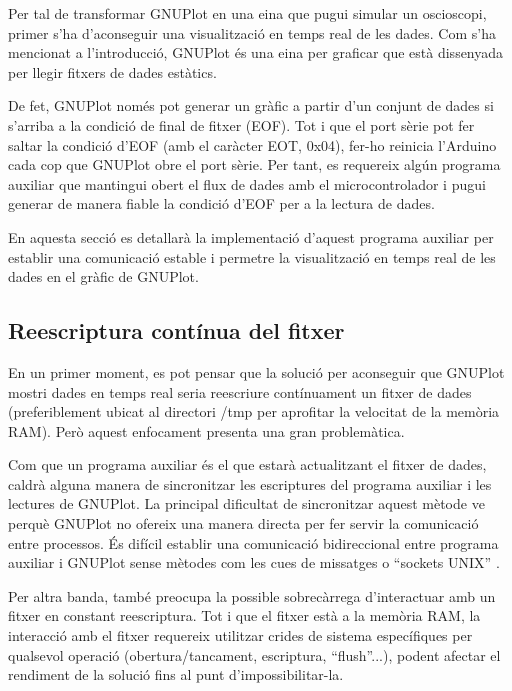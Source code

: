 \documentclass{tfgitic}[2023/06/30]
\begin{document}
Per tal de transformar GNUPlot en una eina que pugui simular un
osci\lgem oscopi, primer s'ha d'aconseguir una visualització en temps
real de les dades. Com s'ha mencionat a l'introducció, GNUPlot és una
eina per graficar que està dissenyada per llegir fitxers de dades
estàtics.

De fet, GNUPlot només pot generar un gràfic a partir d'un conjunt de
dades si s'arriba a la condició de final de fitxer (EOF). Tot i que el
port sèrie pot fer saltar la condició d'EOF (amb el caràcter EOT,
0x04), fer-ho reinicia l'Arduino cada cop que GNUPlot obre el port
sèrie. Per tant, es requereix algún programa auxiliar que mantingui
obert el flux de dades amb el microcontrolador i pugui generar de
manera fiable la condició d'EOF per a la lectura de dades.

En aquesta secció es detallarà la implementació d'aquest programa
auxiliar per establir una comunicació estable i permetre la
visualització en temps real de les dades en el gràfic de GNUPlot.

\subsection{Reescriptura contínua del fitxer}

En un primer moment, es pot pensar que la solució per aconseguir que
GNUPlot mostri dades en temps real seria reescriure contínuament un
fitxer de dades (preferiblement ubicat al directori /tmp per aprofitar
la velocitat de la memòria RAM). Però aquest enfocament presenta una
gran problemàtica.

Com que un programa auxiliar és el que estarà actualitzant el fitxer
de dades, caldrà alguna manera de sincronitzar les escriptures del
programa auxiliar i les lectures de GNUPlot. La principal dificultat
de sincronitzar aquest mètode ve perquè GNUPlot no ofereix una manera
directa per fer servir la comunicació entre processos. És difícil
establir una comunicació bidireccional entre programa auxiliar i
GNUPlot sense mètodes com les cues de missatges \cite{cues-missatges}
o ``sockets UNIX'' \cite{sockets-unix}.

Per altra banda, també preocupa la possible sobrecàrrega d'interactuar
amb un fitxer en constant reescriptura. Tot i que el fitxer està a la
memòria RAM, la interacció amb el fitxer requereix utilitzar crides de
sistema específiques per qualsevol operació (obertura/tancament,
escriptura, ``flush''...), podent afectar el rendiment de la solució
fins al punt d'impossibilitar-la.
\end{document}
